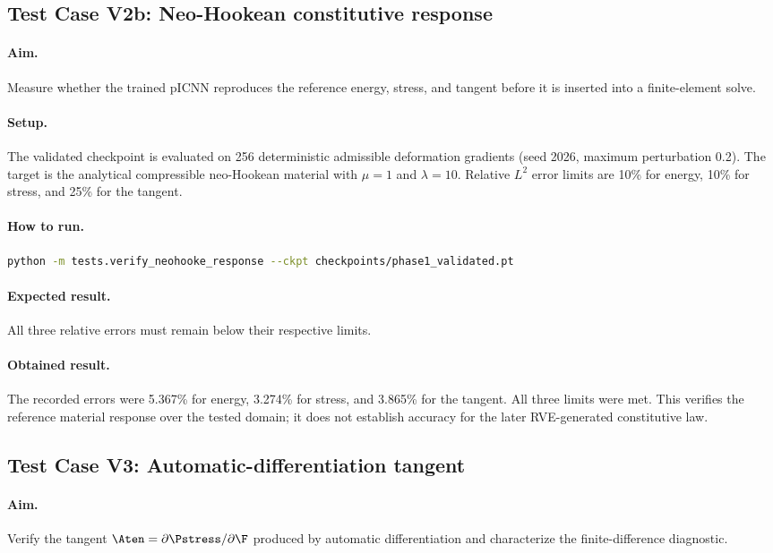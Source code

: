 \subsection*{Test Case V2b: Neo-Hookean constitutive response}
\paragraph{Aim.}
Measure whether the trained pICNN reproduces the reference energy, stress,
and tangent before it is inserted into a finite-element solve.

\paragraph{Setup.}
The validated checkpoint is evaluated on 256 deterministic admissible
deformation gradients (seed 2026, maximum perturbation 0.2). The target is the
analytical compressible neo-Hookean material with \(\mu=1\) and
\(\lambda=10\). Relative \(L^2\) error limits are 10\% for energy, 10\% for
stress, and 25\% for the tangent.

\paragraph{How to run.}
\begin{lstlisting}[language=bash]
python -m tests.verify_neohooke_response --ckpt checkpoints/phase1_validated.pt
\end{lstlisting}

\paragraph{Expected result.}
All three relative errors must remain below their respective limits.

\paragraph{Obtained result.}
The recorded errors were 5.367\% for energy, 3.274\% for stress, and 3.865\%
for the tangent. All three limits were met. This verifies the reference
material response over the tested domain; it does not establish accuracy for
the later RVE-generated constitutive law.

\subsection*{Test Case V3: Automatic-differentiation tangent}
\paragraph{Aim.}
Verify the tangent \(\Aten=\partial\Pstress/\partial\F\) produced by
automatic differentiation and characterize the finite-difference diagnostic.

